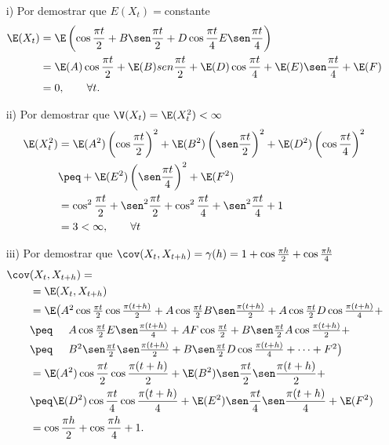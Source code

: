 \begin{ejemplo}
\begin{enumerate}
	\begin{enumerate}
	\item[i)] Por demostrar que $E(X_{t} )=$constante
	\begin{align*}
	\E(X_{t} )& =\E\left( {\cos \frac{\pi t}{2}+B\sen\frac{\pi t}{2}+D\cos \frac{\pi t}{4}E\sen\frac{\pi t}{4}} \right)\\
		&=\E(A)\cos \frac{\pi t}{2}+\E(B)sen\frac{\pi t}{2}+\E(D)\cos \frac{\pi t}{4}+\E(E)\sen\frac{\pi t}{4}+\E(F)\\
		&=0, \qquad\forall t.
	\end{align*}

	\item[ii)] Por demostrar que $\V(X_t)=\E(X_{t}^{2} )<\infty $
	\begin{align*}
	\E(X_{t}^{2} )&= \E(A^{2})\left(\cos \frac{\pi t}{2}\right)^{2}+\E(B^{2})\left(  \sen\frac{\pi t}{2} \right)^{2}+\E(D^{2})\left(\cos \frac{\pi t}{4}\right)^{2}\\
		&\peq+\E(E^{2})\left( \sen\frac{\pi t}{4} \right)^{2}+\E(F^{2})\\
		&=\cos^{2}\frac{\pi t}{2}+\sen^{2}\frac{\pi t}{2}+\cos^{2}\frac{\pi t}{4}+\sen^{2}\frac{\pi t}{4}+1\\
		&=3<\infty,\qquad \forall t
	\end{align*}

	\item[iii)] Por demostrar que $\cov(X_{t}, X_{t+h} )=\gamma (h)=1+\cos \frac{\pi h}{2}+\cos \frac{\pi h}{4}$
	\begin{align*}
	\cov&(X_{t},X_{t+h})=\\
		&=\E(X_{t},X_{t+h} )\\
		& =\textstyle\E\big( A^{2}\cos \frac{\pi t}{2}\cos \frac{\pi (t+h)}{2}+A\cos \frac{\pi t}{2}B\sen\frac{\pi (t+h)}{2}+A\cos \frac{\pi t}{2}D\cos \frac{\pi (t+h)}{4}+\\
		&\peq\phantom{\E(}\textstyle A\cos \frac{\pi t}{2}E\sen\frac{\pi (t+h)}{4}+AF\cos \frac{\pi t}{2}+B\sen\frac{\pi t}{2}A\cos \frac{\pi (t+h)}{2}+\\
		&\peq\phantom{\E(}\textstyle B^{2}\sen\frac{\pi t}{2}\sen\frac{\pi (t+h)}{2}+B\sen\frac{\pi t}{2}D\cos \frac{\pi (t+h)}{4}+\cdots +F^{2}\big)\\
		&=\E(A^{2})\cos \frac{\pi t}{2}\cos \frac{\pi (t+h)}{2}+\E(B^{2})\sen\frac{\pi t}{2}\sen\frac{\pi (t+h)}{2}+\\
		& \peq \E(D^{2})\cos \frac{\pi t}{4}\cos \frac{\pi (t+h)}{4}+\E(E^{2})\sen\frac{\pi t}{4}\sen\frac{\pi (t+h)}{4}+\E(F^{2})\\
		& =\cos \frac{\pi h}{2}+\cos \frac{\pi h}{4}+1.
	\end{align*}
	\end{enumerate}
\end{enumerate}
\end{ejemplo}

